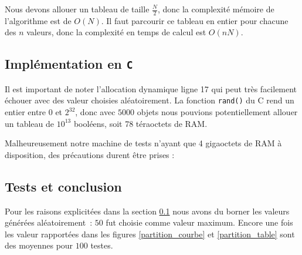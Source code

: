Nous devons allouer un tableau de taille $\frac{N}{2}$, donc la
complexité mémoire de l'algorithme est de $O(N).$ Il faut parcourir ce
tableau en entier pour chacune des $n$ valeurs, donc la complexité en
temps de calcul est $O(nN)$.


\subsection{Implémentation en \texttt{C}}
\label{implementation_c}
Il est important de noter l'allocation dynamique ligne 17 qui peut
très facilement échouer avec des valeur choisies aléatoirement. La
fonction \texttt{rand()} du C rend un entier entre $0$ et $2^{32}$,
donc avec $5000$ objets nous pouvions potentiellement allouer un
tableau de $10^{13}$ booléens, soit 78 téraoctets de RAM.

Malheureusement notre machine de tests n'ayant que 4 gigaoctets de RAM
à disposition, des précautions durent être prises :

\vspace{0.5cm}

 

\subsection{Tests et conclusion}

Pour les raisons explicitées dans la section \ref{implementation_c}
nous avons du borner les valeurs générées aléatoirement~: $50$ fut
choisie comme valeur maximum. Encore une fois les valeur rapportées
dans les figures \ref{partition_courbe} et \ref{partition_table} sont
des moyennes pour $100$ testes.

